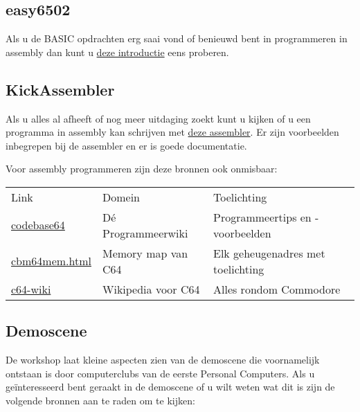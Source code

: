 \documentclass{article}
\begin{document}
\subsection{easy6502}

Als u de BASIC opdrachten erg saai vond of benieuwd bent in programmeren in assembly dan kunt u \href{https://skilldrick.github.io/easy6502/}{deze introductie} eens proberen.

\subsection{KickAssembler}

Als u alles al afheeft of nog meer uitdaging zoekt kunt u kijken of u een programma in assembly kan schrijven met \href{http://theweb.dk/KickAssembler/Main.html#frontpage}{deze assembler}.
Er zijn voorbeelden inbegrepen bij de assembler en er is goede documentatie.

Voor assembly programmeren zijn deze bronnen ook onmisbaar:

\begin{tabular}{l|l|l}
Link & Domein & Toelichting \\
\href{http://codebase64.org}{codebase64} & D\'e Programmeerwiki & Programmeertips en -voorbeelden \\
\href{http://sta.c64.org/cbm64mem.html}{cbm64mem.html} & Memory map van C64 & Elk geheugenadres met toelichting \\
\href{https://www.c64-wiki.com}{c64-wiki} & Wikipedia voor C64 & Alles rondom Commodore \\
\end{tabular}

\subsection{Demoscene}

De workshop laat kleine aspecten zien van de demoscene die voornamelijk ontstaan is door computerclubs van de eerste Personal Computers.
Als u ge\"interesseerd bent geraakt in de demoscene of u wilt weten wat dit is zijn de volgende bronnen aan te raden om te kijken:
\end{document}

